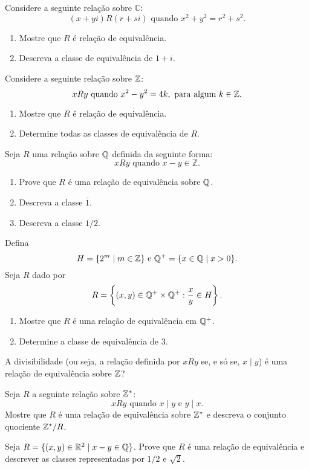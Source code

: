 \documentclass[12pt]{exam}
\begin{document}
\questao Considere a seguinte rela{\c c}{\~a}o sobre $\mathbb{C}$:
\[
(x+yi)R(r+si) \mbox{ quando } x^2+y^2=r^2+s^2.
\]
\begin{enumerate}[label={\alph*})]
\item Mostre que $R$ {\'e} rela{\c c}{\~a}o de equival{\^e}ncia.
\item Descreva a classe de equival{\^e}ncia de $1+i$.
\end{enumerate}

\vspace{.3cm}

\questao Considere a seguinte rela\c{c}\~ao sobre $\mathbb{Z}$:
\[
	xRy \mbox{ quando }  x^2 - y^2 = 4k, \mbox{ para algum } k \in \mathbb{Z}.
\]
\begin{enumerate}[label={\alph*})]
	\item Mostre que $R$ {\'e} rela{\c c}{\~a}o de equival{\^e}ncia.
	\item Determine todas as classes de equival\^encia de $R$.
\end{enumerate}
\vspace{.3cm}

\questao Seja $R$ uma rela{\c c}{\~a}o sobre $\mathbb{Q}$
definida da seguinte forma:
\[
xRy \mbox{ quando } x-y \in \mathbb{Z}.
\]
\begin{enumerate}[label={\alph*})]
\item Prove que $R$ {\'e} uma rela{\c c}{\~a}o de equival{\^e}ncia sobre $\mathbb{Q}$.
\item Descreva a classe $\bar{1}$.
\item Descreva a classe $\overline{1/2}$.
\end{enumerate}

\vspace{.3cm}

\questao Defina
\[
	H = \{2^m \mid m \in \mathbb{Z}\} \mbox{ e } \mathbb{Q}^+ = \{x \in \mathbb{Q} \mid x > 0\}.
\]
Seja $R$ dado por
\[
	R = \left\{(x,y) \in \mathbb{Q}^+\times \mathbb{Q}^+ : \frac{x}{y} \in H\right\}.
\]
\begin{enumerate}[label={\alph*})]
	\item Mostre que $R$ \'e uma rela\c{c}\~ao de equival\^encia em $\mathbb{Q}^+$.
	\item Determine a classe de equival\^encia de $3$.
\end{enumerate}
\vspace{.3cm}

\questao A divisibilidade (ou seja, a rela{\c c}{\~a}o definida por $xRy$ se, e s{\'o}
se, $x \mid y$) {\'e} uma rela{\c c}{\~a}o de equival{\^e}ncia sobre $\mathbb{Z}$?

\vspace{.3cm}

\questao Seja $R$ a seguinte rela{\c c}{\~a}o sobre $\mathbb{Z}^*$:
\[
xRy \mbox{ quando } x\mid y \mbox{ e } y\mid x.
\]
Mostre que $R$ {\'e} uma rela{\c c}{\~a}o de equival{\^e}ncia sobre $\mathbb{Z}^*$ e
descreva o conjunto quociente $\mathbb{Z}^*/R$.

\vspace{.3cm}

\questao Seja $R = \{ (x, y) \in \mathbb{R}^2 \mid x - y \in \mathbb{Q}\}$. Prove que $R$ {\'e} uma rela{\c c}{\~a}o de equival{\^e}ncia e descrever as classes representadas por $1/2$ e $\sqrt{2}$.
\end{document}
